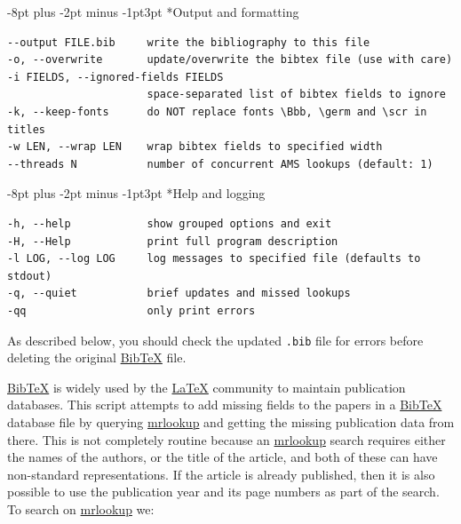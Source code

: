 \documentclass{amsart}
\makeatletter
\renewcommand\subsubsection{\@startsection{subsubsection}{3}{0pt}
  {-8pt plus -2pt minus -1pt}{3pt}
  {\normalfont\normalsize\bfseries\color{NavyBlue}}}
\makeatother
\begin{document}
\subsubsection*{Output and formatting}\label{output-and-formatting}

\begin{Verbatim}[breaklines=true,fontsize=\small]
--output FILE.bib     write the bibliography to this file
-o, --overwrite       update/overwrite the bibtex file (use with care)
-i FIELDS, --ignored-fields FIELDS
                      space-separated list of bibtex fields to ignore
-k, --keep-fonts      do NOT replace fonts \Bbb, \germ and \scr in titles
-w LEN, --wrap LEN    wrap bibtex fields to specified width
--threads N           number of concurrent AMS lookups (default: 1)
\end{Verbatim}

\subsubsection*{Help and logging}\label{help-and-logging}

\begin{Verbatim}[breaklines=true,fontsize=\small]
-h, --help            show grouped options and exit
-H, --Help            print full program description
-l LOG, --log LOG     log messages to specified file (defaults to stdout)
-q, --quiet           brief updates and missed lookups
-qq                   only print errors
\end{Verbatim}

As described below, you should check the updated \texttt{.bib} file for
errors before deleting the original
\href{http://www.bibtex.org/}{BibTeX} file.

\href{http://www.bibtex.org/}{BibTeX} is widely used by the
\href{https://latex-project.org/}{LaTeX} community to maintain
publication databases. This script attempts to add missing fields to the
papers in a \href{http://www.bibtex.org/}{BibTeX} database file by
querying
\href{https://mathscinet.ams.org/mathscinet/freetools/mrlookup}{mrlookup}
and getting the missing publication data from there. This is not
completely routine because an
\href{https://mathscinet.ams.org/mathscinet/freetools/mrlookup}{mrlookup}
search requires either the names of the authors, or the title of the
article, and both of these can have non-standard representations. If the
article is already published, then it is also possible to use the
publication year and its page numbers as part of the search. To search
on
\href{https://mathscinet.ams.org/mathscinet/freetools/mrlookup}{mrlookup}
we:
\end{document}

